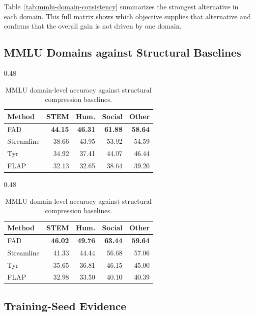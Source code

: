 \documentclass{article}
\theoremstyle{plain}
\theoremstyle{definition}
\theoremstyle{remark}
\begin{document}
Table~\ref{tab:mmlu-domain-consistency} summarizes the strongest alternative
in each domain.  This full matrix shows which objective supplies that alternative
and confirms that the overall gain is not driven by one domain.

\subsection{MMLU Domains against Structural Baselines}

\begin{table}[H]
\centering
\begin{subtable}[t]{0.48\linewidth}
\centering\footnotesize
\caption{0-shot}
\label{tab:app-mmlu-zero-domain}
\setlength{\tabcolsep}{3.1pt}
\begin{tabular}{@{}lrrrr@{}}
\toprule
\textbf{Method} & \textbf{STEM} & \textbf{Hum.} & \textbf{Social} & \textbf{Other}\\
\midrule
FAD & \textbf{44.15} & \textbf{46.31} & \textbf{61.88} & \textbf{58.64}\\
Streamline & 38.66 & 43.95 & 53.92 & 54.59\\
Tyr & 34.92 & 37.41 & 44.07 & 46.44\\
FLAP & 32.13 & 32.65 & 38.64 & 39.20\\
\bottomrule
\end{tabular}
\end{subtable}\hfill
\begin{subtable}[t]{0.48\linewidth}
\centering\footnotesize
\caption{5-shot}
\label{tab:app-mmlu-five-domain}
\setlength{\tabcolsep}{3.1pt}
\begin{tabular}{@{}lrrrr@{}}
\toprule
\textbf{Method} & \textbf{STEM} & \textbf{Hum.} & \textbf{Social} & \textbf{Other}\\
\midrule
FAD & \textbf{46.02} & \textbf{49.76} & \textbf{63.44} & \textbf{59.64}\\
Streamline & 41.33 & 44.44 & 56.68 & 57.06\\
Tyr & 35.65 & 36.81 & 46.15 & 45.00\\
FLAP & 32.98 & 33.50 & 40.10 & 40.39\\
\bottomrule
\end{tabular}
\end{subtable}
\caption{MMLU domain-level accuracy against structural compression baselines.}
\label{tab:app-mmlu-domains-structural}
\end{table}

\subsection{Training-Seed Evidence}
\end{document}
